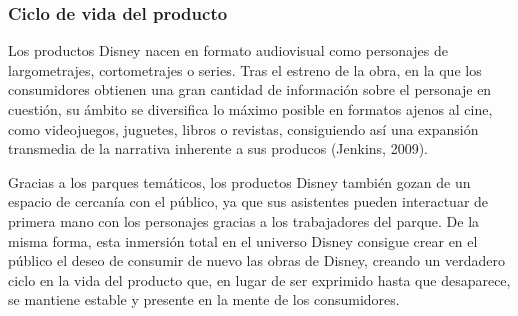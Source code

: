 \subsubsection{Ciclo de vida del producto}

Los productos Disney nacen en formato audiovisual como personajes de largometrajes, cortometrajes o series. Tras el estreno de la obra, en la que los consumidores obtienen una gran cantidad de información sobre el personaje en cuestión, su ámbito se diversifica lo máximo posible en formatos ajenos al cine, como videojuegos, juguetes, libros o revistas, consiguiendo así una expansión transmedia de la narrativa inherente a sus producos (Jenkins, 2009).

Gracias a los parques temáticos, los productos Disney también gozan de un espacio de cercanía con el público, ya que sus asistentes pueden interactuar de primera mano con los personajes gracias a los trabajadores del parque. De la misma forma, esta inmersión total en el universo Disney consigue crear en el público el deseo de consumir de nuevo las obras de Disney, creando un verdadero ciclo en la vida del producto que, en lugar de ser exprimido hasta que desaparece, se mantiene estable y presente en la mente de los consumidores.
